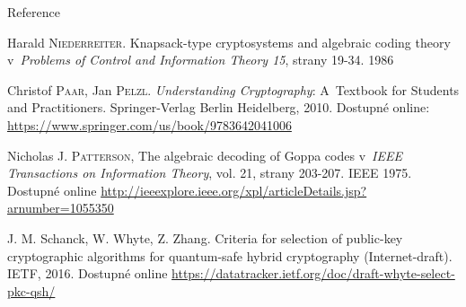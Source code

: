 \documentclass{beamer}
\begin{document}
\begin{frame}[allowframebreaks]{Reference}
\begin{thebibliography}{99}
        Harald \textsc{Niederreiter}. Knapsack-type cryptosystems and
        algebraic coding theory v~\emph{Problems of Control and Information
        Theory 15}, strany 19-34. 1986

        Christof \textsc{Paar}, Jan \textsc{Pelzl}. \emph{Understanding
        Cryptography}: A~Textbook for Students and Practitioners.
        Springer-Verlag Berlin Heidelberg, 2010. Dostupné
        online: \url{https://www.springer.com/us/book/9783642041006}

        Nicholas J. \textsc{Patterson}, The algebraic decoding of Goppa codes
        v~\emph{IEEE Transactions on Information Theory}, vol. 21, strany
        203-207. IEEE 1975. Dostupné online
        \url{http://ieeexplore.ieee.org/xpl/articleDetails.jsp?arnumber=1055350}

        J. M. Schanck, W. Whyte, Z. Zhang. Criteria for selection of public-key
        cryptographic algorithms for quantum-safe hybrid cryptography
        (Internet-draft). IETF, 2016. Dostupné online
        \url{https://datatracker.ietf.org/doc/draft-whyte-select-pkc-qsh/}

    \end{thebibliography}

\end{frame}
\end{document}
